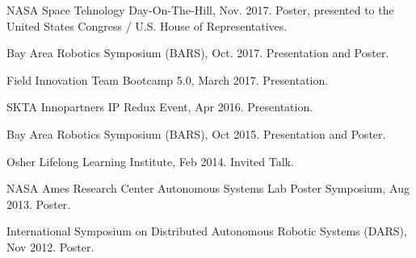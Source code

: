 \documentclass[letterpaper]{deedy-resume} %
\begin{document}
\vspace{0.2cm}
\begin{etaremune}
  

\item {} NASA Space Tehnology Day-On-The-Hill, Nov. 2017. Poster, presented to the United States Congress / U.S. House of Representatives.

\item {} Bay Area Robotics Symposium (BARS), Oct. 2017. Presentation and Poster.

\item {} Field Innovation Team Bootcamp 5.0, March 2017. Presentation.

\item {} SKTA Innopartners IP Redux Event, Apr 2016. Presentation.

\item {} Bay Area Robotics Symposium (BARS), Oct 2015. Presentation and Poster.
  
\item {} Osher Lifelong Learning Institute, Feb 2014. Invited Talk.

\item {} NASA Ames Research Center Autonomous Systems Lab Poster Symposium, Aug 2013. Poster.

\item {} International Symposium on Distributed Autonomous Robotic Systems (DARS), Nov 2012. Poster.

\end{etaremune}



\end{document}
